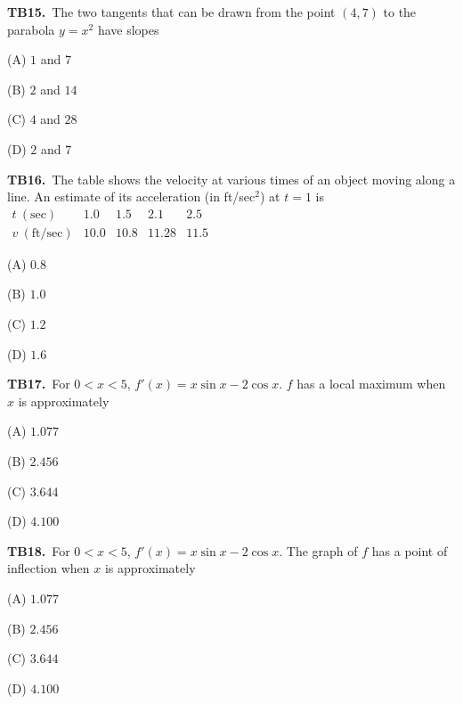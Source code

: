 \documentclass[11pt]{article}
\begin{document}
\bigskip\noindent\textbf{TB15.}\ The two tangents that can be drawn from the point $(4,7)$ to the parabola $y=x^2$ have slopes
\begin{list}{}{\setlength{\leftmargin}{3em}\setlength{\labelwidth}{2.5em}\setlength{\itemsep}{0pt}\setlength{\topsep}{2pt}}
\item[(A)] $1$ and $7$
\item[(B)] $2$ and $14$
\item[(C)] $4$ and $28$
\item[(D)] $2$ and $7$
\end{list}

\bigskip\noindent\textbf{TB16.}\ The table shows the velocity at various times of an object moving along a line. An estimate of its acceleration (in ft/sec$^2$) at $t=1$ is $\begin{array}{c|rrrr}t\ (\mathrm{sec})&1.0&1.5&2.1&2.5\\v\ (\mathrm{ft/sec})&10.0&10.8&11.28&11.5\end{array}$
\begin{list}{}{\setlength{\leftmargin}{3em}\setlength{\labelwidth}{2.5em}\setlength{\itemsep}{0pt}\setlength{\topsep}{2pt}}
\item[(A)] $0.8$
\item[(B)] $1.0$
\item[(C)] $1.2$
\item[(D)] $1.6$
\end{list}

\bigskip\noindent\textbf{TB17.}\ For $0<x<5$, $f\prime(x)=x\sin x-2\cos x$. $f$ has a local maximum when $x$ is approximately
\begin{list}{}{\setlength{\leftmargin}{3em}\setlength{\labelwidth}{2.5em}\setlength{\itemsep}{0pt}\setlength{\topsep}{2pt}}
\item[(A)] $1.077$
\item[(B)] $2.456$
\item[(C)] $3.644$
\item[(D)] $4.100$
\end{list}

\bigskip\noindent\textbf{TB18.}\ For $0<x<5$, $f\prime(x)=x\sin x-2\cos x$. The graph of $f$ has a point of inflection when $x$ is approximately
\begin{list}{}{\setlength{\leftmargin}{3em}\setlength{\labelwidth}{2.5em}\setlength{\itemsep}{0pt}\setlength{\topsep}{2pt}}
\item[(A)] $1.077$
\item[(B)] $2.456$
\item[(C)] $3.644$
\item[(D)] $4.100$
\end{list}
\end{document}
